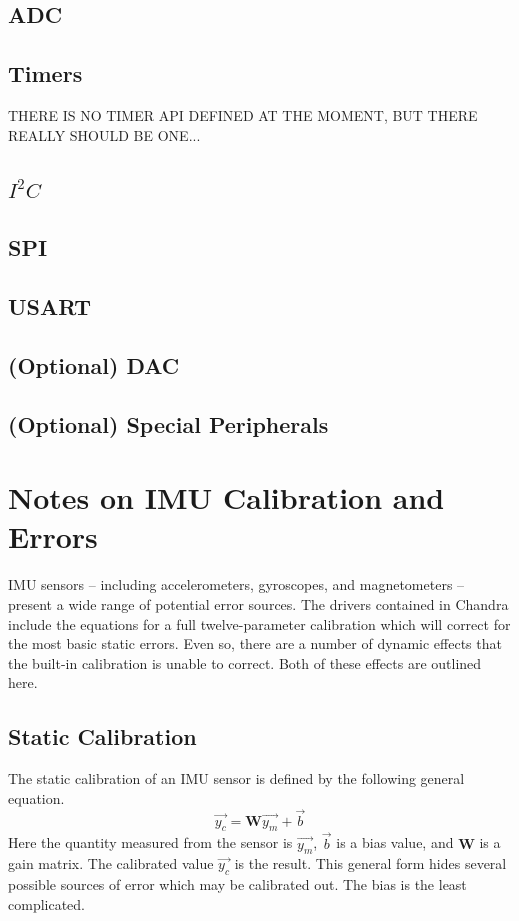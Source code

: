 \documentclass[10pt,letterpaper]{memoir} %
\newcommand{\iic}[0]{$I^{2}C$}
\begin{document}
\section{ADC}
\section{Timers}
THERE IS NO TIMER API DEFINED AT THE MOMENT, BUT THERE REALLY SHOULD BE ONE...
\section{\iic}
\section{SPI}
\section{USART}

\section{(Optional) DAC}
\section{(Optional) Special Peripherals}

\chapter{Notes on IMU Calibration and Errors}
IMU sensors -- including accelerometers, gyroscopes, and magnetometers -- present a wide range of potential error sources.  The drivers contained in Chandra include the equations for a full twelve-parameter calibration which will correct for the most basic static errors.  Even so, there are a number of dynamic effects that the built-in calibration is unable to correct.  Both of these effects are outlined here.

\section{Static Calibration}
The static calibration of an IMU sensor is defined by the following general equation.
\begin{equation}
	\vec{y_c} = \mathbf{W}\vec{y_m} + \vec{b}
\end{equation}
Here the quantity measured from the sensor is $\vec{y_m}$, $\vec{b}$ is a bias value, and $\mathbf{W}$ is a gain matrix.  The calibrated value $\vec{y_c}$ is the result.  This general form hides several possible sources of error which may be calibrated out.  The bias is the least complicated.
\end{document}
